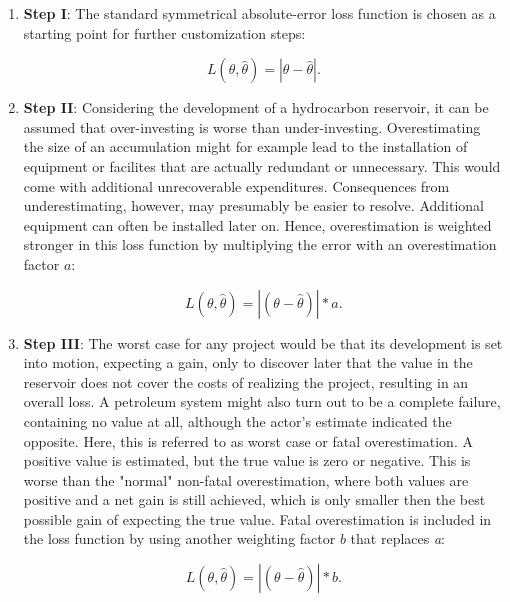 		\begin{enumerate}
			\item \textbf{Step I}: The standard symmetrical absolute-error loss function is chosen as a starting point for further customization steps:
			
			\begin{equation}
			L(\theta,\hat{\theta}) = |\theta - \hat{\theta}|.
			\end{equation}  
			
			\item \textbf{Step II}: Considering the development of a hydrocarbon reservoir, it can be assumed that over-investing is worse than under-investing. Overestimating the size of an accumulation might for example lead to the installation of equipment or facilites that are actually redundant or unnecessary. This would come with additional unrecoverable expenditures. Consequences from underestimating, however, may presumably be easier to resolve. Additional equipment can often be installed later on. Hence, overestimation is weighted stronger in this loss function by multiplying the error with an overestimation factor $a$:
			
			\begin{equation}\label{eq:LF_II}
			L(\theta,\hat{\theta}) = |(\theta-\hat{\theta})|*a.
			\end{equation}
			
			\item \textbf{Step III}: The worst case for any project would be that its development is set into motion, expecting a gain, only to discover later that the value in the reservoir does not cover the costs of realizing the project, resulting in an overall loss. A petroleum system might also turn out to be a complete failure, containing no value at all, although the actor's estimate indicated the opposite. Here, this is referred to as worst case or fatal overestimation. A positive value is estimated, but the true value is zero or negative. This is worse than the "normal" non-fatal overestimation, where both values are positive and a net gain is still achieved, which is only smaller then the best possible gain of expecting the true value. Fatal overestimation is included in the loss function by using another weighting factor $b$ that replaces \textit{a}:
			
			\begin{equation}\label{eq:LF_III}
			L(\theta,\hat{\theta}) = |(\theta-\hat{\theta})|*b.
			\end{equation}
			

\end{enumerate}
